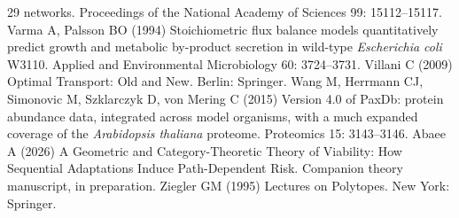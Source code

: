 \begin{thebibliography}{29}
             networks. Proceedings of the National Academy of Sciences 99: 15112--15117.
Varma A, Palsson BO (1994) Stoichiometric flux balance models quantitatively predict
             growth and metabolic by-product secretion in wild-type
             \emph{Escherichia coli} {W3110}. Applied and Environmental Microbiology 60: 3724--3731.
Villani C (2009) Optimal Transport: Old and New. Berlin: Springer.
Wang M, Herrmann CJ, Simonovic M, Szklarczyk D, von Mering C (2015) Version 4.0 of {PaxDb}: protein abundance data, integrated
             across model organisms, with a much expanded coverage of the
             \emph{Arabidopsis thaliana} proteome. Proteomics 15: 3143--3146.
Abaee A (2026) A Geometric and Category-Theoretic Theory of Viability: How
           Sequential Adaptations Induce Path-Dependent Risk.
           Companion theory manuscript, in preparation.
Ziegler GM (1995) Lectures on Polytopes. New York: Springer.
\end{thebibliography}
